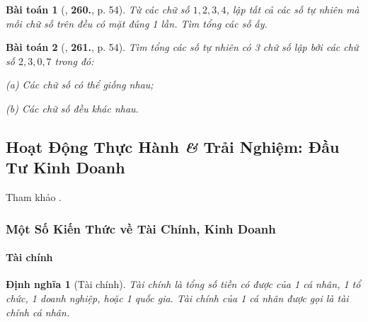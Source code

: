 \documentclass{article}
\numberwithin{equation}{section}
\newtheorem{dinhnghia}{Định nghĩa}[section]
\newtheorem{baitoan}{Bài toán}[section]
\begin{document}
\begin{baitoan}[\cite{Binh_Toan_6_tap_1}, \textbf{260.}, p. 54]
	Từ các chữ số $1,2,3,4$, lập tất cả các số tự nhiên mà mỗi chữ số trên đều có mặt đúng 1 lần. Tìm tổng các số ấy.
\end{baitoan}

\begin{baitoan}[\cite{Binh_Toan_6_tap_1}, \textbf{261.}, p. 54]
	Tìm tổng các số tự nhiên có 3 chữ số lập bởi các chữ số $2,3,0,7$ trong đó:
	\begin{enumerate*}
		\item[(a)] Các chữ số có thể giống nhau;
		\item[(b)] Các chữ số đều khác nhau.
	\end{enumerate*}
\end{baitoan}


\subsection{Hoạt Động Thực Hành \textit{\&} Trải Nghiệm: Đầu Tư Kinh Doanh}
Tham khảo \cite[pp. 89--92]{SGK_Toan_6_Canh_Dieu_tap_1}.

\subsubsection{Một Số Kiến Thức về Tài Chính, Kinh Doanh}

\paragraph{Tài chính}
\begin{dinhnghia}[Tài chính]
	\emph{Tài chính} là tổng số tiền có được của 1 cá nhân, 1 tổ chức, 1 doanh nghiệp, hoặc 1 quốc gia. Tài chính của 1 cá nhân được gọi là \emph{tài chính cá nhân}.
\end{dinhnghia}
\end{document}
